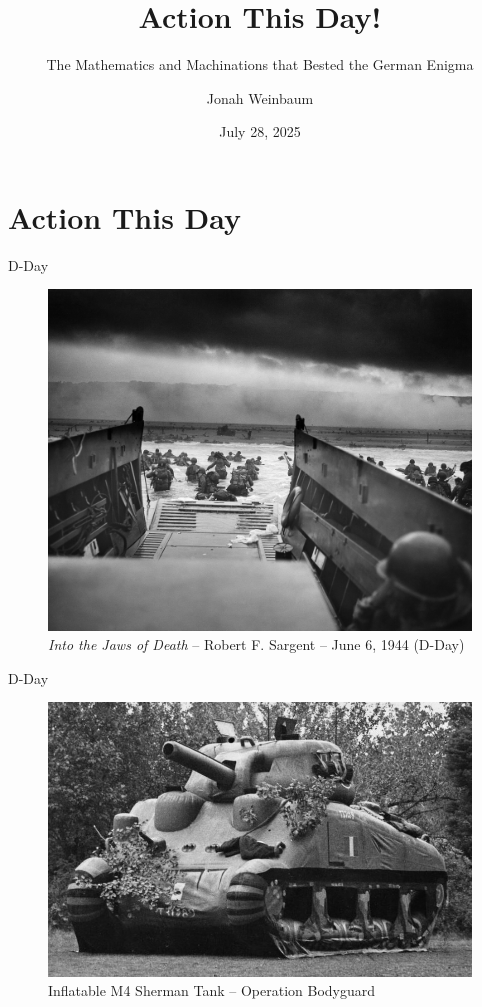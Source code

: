 \documentclass[hyphens,aspectratio=169]{beamer}
\title{Action This Day!}
\subtitle{The Mathematics and Machinations that Bested the German Enigma}
\author{Jonah Weinbaum}
\date{
July 28, 2025
}
\begin{document}
\frame{\titlepage}

\section{Action This Day}

\begin{frame}[fragile]{D-Day}
	\begin{center}
		\begin{figure}
			\includegraphics[scale=0.11]{paper/images/dday.jpg}
			\small
			\caption{\emph{Into the Jaws of Death} -- Robert F. Sargent -- June 6, 1944 (D-Day)}
		\end{figure}

	\end{center}
\end{frame}

\begin{frame}[fragile]{D-Day}
	\begin{center}
		\begin{figure}
			\includegraphics[scale=0.3]{paper/images/dummy_tank.jpg}
			\small
			\caption{Inflatable M4 Sherman Tank -- Operation Bodyguard}
		\end{figure}

	\end{center}
\end{frame}
\end{document}
